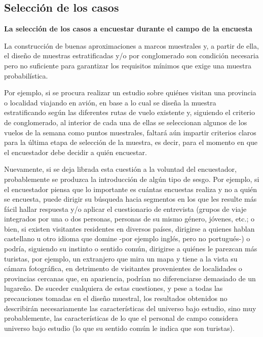 \documentclass[
]{book}
\begin{document}
\hypertarget{selecciuxf3n-de-los-casos}{%
\subsection{Selección de los casos}\label{selecciuxf3n-de-los-casos}}

\textbf{La selección de los casos a encuestar durante el campo de la encuesta}

La construcción de buenas aproximaciones a marcos muestrales y, a partir de ella, el diseño de muestras estratificadas y/o por conglomerado son condición necesaria pero no suficiente para garantizar los requisitos mínimos que exige una muestra probabilística.

Por ejemplo, si se procura realizar un estudio sobre quiénes visitan una provincia o localidad viajando en avión, en base a lo cual se diseña la muestra estratificando según las diferentes rutas de vuelo existente y, siguiendo el criterio de conglomerado, al interior de cada una de ellas se seleccionan algunos de los vuelos de la semana como puntos muestrales, faltará aún impartir criterios claros para la última etapa de selección de la muestra, es decir, para el momento en que el encuestador debe decidir a quién encuestar.

Nuevamente, si se deja librada esta cuestión a la voluntad del encuestador, probablemente se produzca la introducción de algún tipo de sesgo. Por ejemplo, si el encuestador piensa que lo importante es cuántas encuestas realiza y no a quién se encuesta, puede dirigir su búsqueda hacia segmentos en los que les resulte más fácil hallar respuesta y/o aplicar el cuestionario de entrevista (grupos de viaje integrados por una o dos personas, personas de su mismo género, jóvenes, etc.; o bien, si existen visitantes residentes en diversos países, dirigirse a quienes hablan castellano u otro idioma que domine -por ejemplo inglés, pero no portugués-) o podría, siguiendo su instinto o sentido común, dirigirse a quiénes le parezcan más turistas, por ejemplo, un extranjero que mira un mapa y tiene a la vista su cámara fotográfica, en detrimento de visitantes provenientes de localidades o provincias cercanas que, en apariencia, podrían no diferenciarse demasiado de un lugareño. De suceder cualquiera de estas cuestiones, y pese a todas las precauciones tomadas en el diseño muestral, los resultados obtenidos no describirán necesariamente las características del universo bajo estudio, sino muy probablemente, las características de lo que el personal de campo considera universo bajo estudio (lo que su sentido común le indica que son turistas).
\end{document}
